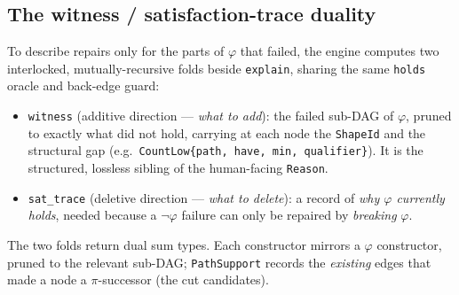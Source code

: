 \documentclass[11pt]{article}
\newcommand{\code}[1]{\texttt{#1}}
\theoremstyle{definition}
\begin{document}
\subsection{The witness / satisfaction-trace duality}
To describe repairs only for the parts of $\varphi$ that failed, the engine
computes two interlocked, mutually-recursive folds beside \code{explain}, sharing
the same \code{holds} oracle and back-edge guard:
\begin{itemize}[leftmargin=1.4em]
  \item \code{witness} (additive direction --- \emph{what to add}): the failed
  sub-DAG of $\varphi$, pruned to exactly what did not hold, carrying at each node
  the \code{ShapeId} and the structural gap (e.g.\ \code{CountLow\{path, have,
  min, qualifier\}}). It is the structured, lossless sibling of the human-facing
  \code{Reason}.
  \item \code{sat\_trace} (deletive direction --- \emph{what to delete}): a record
  of \emph{why $\varphi$ currently holds}, needed because a $\neg\varphi$ failure
  can only be repaired by \emph{breaking} $\varphi$.
\end{itemize}
The two folds return dual sum types. Each constructor mirrors a $\varphi$
constructor, pruned to the relevant sub-DAG; \code{PathSupport} records the
\emph{existing} edges that made a node a $\pi$-successor (the cut candidates).
\end{document}
